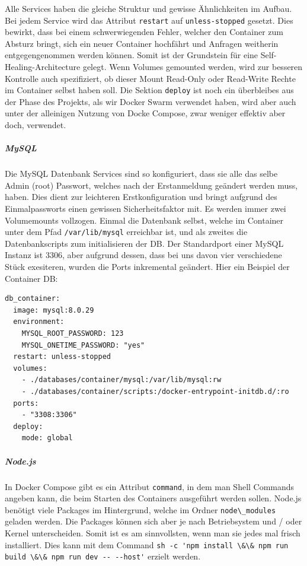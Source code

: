 \documentclass[
    headings=optiontotocandhead,%
    twoside,
    numbers=noenddot,%
    12pt, %
    titlepage, %
    parskip=full, %
    listof=leveldown, 
    numbers=noenddot, %
    a4paper,DIV=14,
    BCOR=15mm,
]{scrbook}
\newcommand{\passthrough}[1]{#1}
\begin{document}
Alle Services haben die gleiche Struktur und gewisse Ähnlichkeiten im
Aufbau. Bei jedem Service wird das Attribut
\passthrough{\lstinline!restart!} auf
\passthrough{\lstinline!unless-stopped!} gesetzt. Dies bewirkt, dass bei
einem schwerwiegenden Fehler, welcher den Container zum Absturz bringt,
sich ein neuer Container hochfährt und Anfragen weitherin
entgegengenommen werden können. Somit ist der Grundstein für eine
Self-Healing-Architecture gelegt. Wenn Volumes gemounted werden, wird
zur besseren Kontrolle auch spezifiziert, ob dieser Mount Read-Only oder
Read-Write Rechte im Container selbst haben soll. Die Sektion
\passthrough{\lstinline!deploy!} ist noch ein überbleibes aus der Phase
des Projekts, als wir Docker Swarm verwendet haben, wird aber auch unter
der alleinigen Nutzung von Docke Compose, zwar weniger effektiv aber
doch, verwendet.

\hypertarget{mysql-1}{%
\subparagraph{MySQL}\label{mysql-1}}

Die MySQL Datenbank Services sind so konfiguriert, dass sie alle das
selbe Admin (root) Passwort, welches nach der Erstanmeldung geändert
werden muss, haben. Dies dient zur leichteren Erstkonfiguration und
bringt aufgrund des Einmalpassworts einen gewissen Sicherheitsfaktor
mit. Es werden immer zwei Volumemounts vollzogen. Einmal die Datenbank
selbst, welche im Container unter dem Pfad
\passthrough{\lstinline!/var/lib/mysql!} erreichbar ist, und als zweites
die Datenbankscripts zum initialisieren der DB. Der Standardport einer
MySQL Instanz ist 3306, aber aufgrund dessen, dass bei uns davon vier
verschiedene Stück exesiteren, wurden die Ports inkremental geändert.
Hier ein Beispiel der Container DB:

\begin{lstlisting}[caption={Definition eines MySQL Services}]
db_container:
  image: mysql:8.0.29
  environment:
    MYSQL_ROOT_PASSWORD: 123
    MYSQL_ONETIME_PASSWORD: "yes"
  restart: unless-stopped
  volumes:
    - ./databases/container/mysql:/var/lib/mysql:rw
    - ./databases/container/scripts:/docker-entrypoint-initdb.d/:ro
  ports:
    - "3308:3306"
  deploy:
    mode: global
\end{lstlisting}

\hypertarget{node.js}{%
\subparagraph{Node.js}\label{node.js}}

In Docker Compose gibt es ein Attribut
\passthrough{\lstinline!command!}, in dem man Shell Commands angeben
kann, die beim Starten des Containers ausgeführt werden sollen. Node.js
benötigt viele Packages im Hintergrund, welche im Ordner
\passthrough{\lstinline!node\_modules!} geladen werden. Die Packages
können sich aber je nach Betriebsystem und / oder Kernel unterscheiden.
Somit ist es am sinnvollsten, wenn man sie jedes mal frisch installiert.
Dies kann mit dem Command
\passthrough{\lstinline!sh -c 'npm install \&\& npm run build \&\& npm run dev -- --host'!}
erzielt werden.
\end{document}
